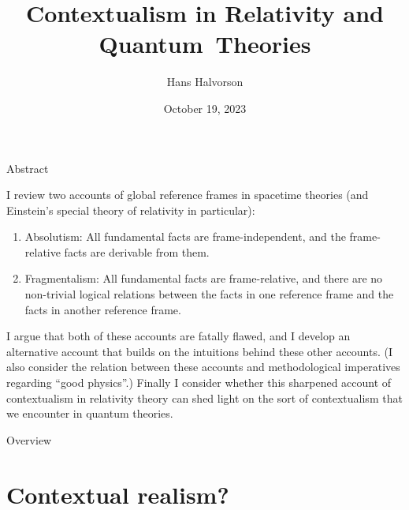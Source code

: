 \documentclass[fleqn]{beamer}
\title{Contextualism in Relativity and Quantum~Theories}
\author{Hans Halvorson}
\date{October 19, 2023}
\begin{document}
\begin{frame}[plain]

  \titlepage

\end{frame}


\begin{frame}[plain]{Abstract}

  I review two accounts of global reference frames in spacetime
  theories (and Einstein's special theory of relativity in
  particular):

  \begin{enumerate}
  \item Absolutism: All fundamental facts are frame-independent, and
    the frame-relative facts are derivable from them.
  \item Fragmentalism: All fundamental facts are frame-relative, and
    there are no non-trivial logical relations between the facts in
    one reference frame and the facts in another reference frame.
  \end{enumerate}

  I argue that both of these accounts are fatally flawed, and I
  develop an alternative account that builds on the intuitions behind
  these other accounts. (I also consider the relation between these
  accounts and methodological imperatives regarding ``good physics''.)
  Finally I consider whether this sharpened account of contextualism
  in relativity theory can shed light on the sort of contextualism
  that we encounter in quantum theories.

\end{frame}

\begin{frame}[plain]{Overview}

  \tableofcontents

\end{frame}


\section{Contextual realism?}
\end{document}
